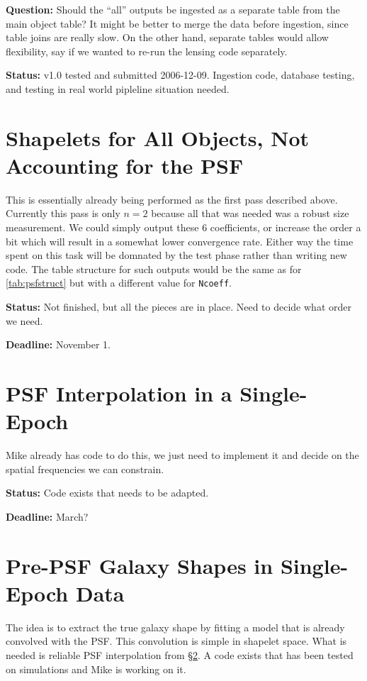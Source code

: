 \documentclass[12pt]{article}
\newcommand{\ncoeff}{\texttt{Ncoeff}}
\begin{document}
{\bf Question: } Should the ``all'' outputs be ingested as a separate table
from the main object table?  It might be better to merge the data before
ingestion, since table joins are really slow.  On the other hand, separate
tables would allow flexibility, say if we wanted to re-run the lensing
code separately.

{\bf Status:} v1.0 tested and submitted 2006-12-09.  Ingestion code, database
testing, and testing in real world pipleline situation needed.

\section{Shapelets for All Objects, Not Accounting for the PSF}
\label{sec:seall}

This is essentially already being performed as the first pass described above.
Currently this pass is only $n=2$ because all that was needed was a robust size
measurement.  We could simply output these 6 coefficients, or increase the
order a bit which will result in a somewhat lower convergence rate.  Either way
the time spent on this task will be domnated by the test phase rather than
writing new code.  The table structure for such outputs would be the same as
for \ref{tab:psfstruct} but with a different value for \ncoeff.

{\bf Status:} Not finished, but all the pieces are in place.  Need to decide
what order we need.

{\bf Deadline:}  November 1.

\section{PSF Interpolation in a Single-Epoch} \label{sec:seinterp}

Mike already has code to do this, we just need to implement it and decide
on the spatial frequencies we can constrain.

{\bf Status:} Code exists that needs to be adapted.

{\bf Deadline:} March?

\section{Pre-PSF Galaxy Shapes in Single-Epoch Data} \label{sec:deconv}

The idea is to extract the true galaxy shape by fitting a model that is already
convolved with the PSF.  This convolution is simple in shapelet space. What is
needed is reliable PSF interpolation from \S \ref{sec:seinterp}.  A code
exists that has been tested on simulations and Mike is working on it.
\end{document}
